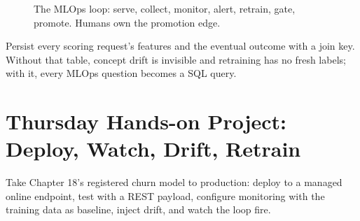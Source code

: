 \begin{figure}[H]
    \centering
    \caption{The MLOps loop: serve, collect, monitor, alert, retrain, gate, promote. Humans own the promotion edge.}
    \label{fig:ch19-mlops-loop}
\end{figure}

\begin{tipbox}
Persist every scoring request's features and the eventual outcome with a join key. Without that table, concept drift is invisible and retraining has no fresh labels; with it, every MLOps question becomes a SQL query.
\end{tipbox}

\section{Thursday Hands-on Project: Deploy, Watch, Drift, Retrain}
Take Chapter 18's registered churn model to production: deploy to a managed online endpoint, test with a REST payload, configure monitoring with the training data as baseline, inject drift, and watch the loop fire.

